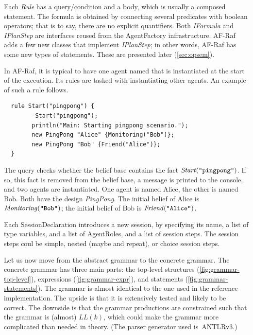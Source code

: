 \documentclass[a4paper,12pt,oneside,fleqn]{book} %
\newcommand{\todo}[1]{[\textcolor{red}{TODO}: #1]}
\begin{document}
{Each {\it Rule\/} has a query\slash condition and a body, which is usually
a composed statement. The formula is obtained by connecting several
predicates with boolean operators; that is to say, there are no explicit
quantifiers. Both {\it IFormula\/} and {\it IPlanStep\/} are interfaces
reused from the AgentFactory infrastructure. AF-Raf adds a few new classes
that implement {\it IPlanStep\/}; in other words, AF-Raf has some new
types of statements. These are presented later (\autoref{sec:opsem}).

\begin{example}
In AF-Raf, it is typical to have one agent named that is instantiated at
the start of the execution. Its rules are tasked with instantiating other
agents. An example of such a rule follows.
\begin{verbatim}
  rule Start("pingpong") {
        -Start("pingpong");
        println("Main: Starting pingpong scenario.");
        new PingPong "Alice" {Monitoring("Bob")};
        new PingPong "Bob" {Friend("Alice")};
  }
\end{verbatim}
The query checks whether the belief base contains the fact ${\it
Start}(\text{\tt``pingpong''})$. If so, this fact is removed from the
belief base, a message is printed to the console, and two agents are
instantiated. One agent is named Alice, the other is named Bob. Both have
the design {\it PingPong}. The initial belief of Alice is ${\it
Monitoring}(\text{\tt ``Bob''})$; the initial belief of Bob is ${\it
Friend}(\text{\tt``Alice''})$.
\end{example}


Each SessionDeclaration introduces a new session, by specifying its name, a
list of type variables, and a list of AgentRoles, and a list of session
steps. The session steps coul be simple, nested (maybe and repeat), or
choice session steps.

Let us now move from the abstract grammar to the concrete grammar.  The
concrete grammar has three main parts: the top-level structures
(\autoref{fig:grammar-top-level}), expressions
(\autoref{fig:grammar-expr}), and statements
(\autoref{fig:grammar-statements}). The grammar is almost identical to the
one used in the reference implementation. The upside is that it is
extensively tested and likely to be correct. The downside is that the
grammar productions are constrained such that the grammar is (almost)
$LL(k)$, which could make the grammar more complicated than needed in
theory. (The parser generator used is~ANTLRv3.)

}
\end{document}
